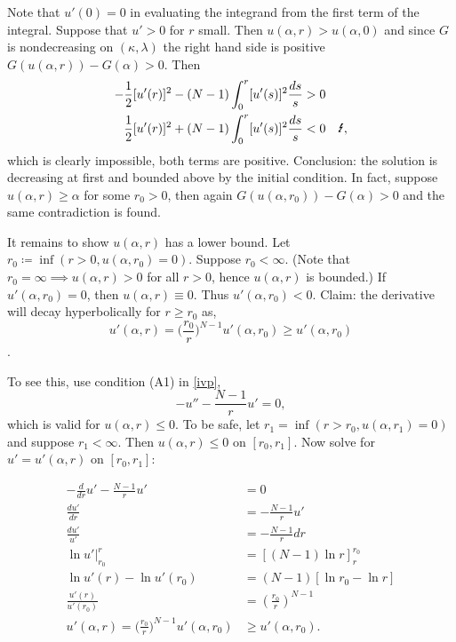 Note that $u'(0)=0$ in evaluating the integrand from the first term of the integral. Suppose that $u'>0$ for $r$ small. Then $u(\alpha,r)>u(\alpha,0)$ and since $G$ is nondecreasing on $(\kappa,\lambda)$ the right hand side is positive $G(u(\alpha,r))-G(\alpha)>0$. Then
\begin{align*}
-\frac{1}{2}[u'(r)]^2-(N-1)\int_0^r[u'(s)]^2\frac{ds}{s}&>0\\
\frac{1}{2}[u'(r)]^2+(N-1)\int_0^r[u'(s)]^2\frac{ds}{s}&<0\quad\text{\Lightning},
\end{align*}
which is clearly impossible, both terms are positive. Conclusion: the solution is decreasing at first and bounded above by the initial condition. In fact, suppose $u(\alpha,r)\geq\alpha$ for some $r_0>0$, then again $G(u(\alpha,r_0))-G(\alpha)>0$ and the same contradiction is found.

It remains to show $u(\alpha,r)$ has a lower bound. Let $r_0\coloneqq\inf(r>0,u(\alpha,r_0)=0).$ Suppose $r_0<\infty$. (Note that $r_0=\infty\implies u(\alpha,r)>0$ for all $r>0$, hence $u(\alpha,r)$ is bounded.) If $u'(\alpha,r_0)=0$, then $u(\alpha,r)\equiv0$. Thus $u'(\alpha,r_0)<0$. Claim: the derivative will decay hyperbolically for $r\geq r_0$ as,  $$u'(\alpha,r)=\big(\frac{r_0}{r}\big)^{N-1}u'(\alpha,r_0)\geq u'(\alpha,r_0)$$.

To see this, use condition (A1) in \eqref{ivp},
$$-u''-\frac{N-1}{r}u'=0,$$%
which is valid for $u(\alpha,r)\leq0.$ To be safe, let $r_1=\inf(r>r_0,u(\alpha,r_1)=0)$ and suppose $r_1<\infty$. Then $u(\alpha,r)\leq0$ on $[r_0,r_1]$. Now solve for $u'=u'(\alpha,r)$ on $[r_0,r_1]$:

\begin{align*}
-\frac{d}{dr}u'-\frac{N-1}{r}u'&=0\\
\frac{du'}{dr}&=-\frac{N-1}{r}u'\\
\frac{du'}{u'}&=-\frac{N-1}{r}dr\\
\left.\ln{u'}\right\rvert_{r_0}^r&=\left[(N-1)\ln{r}\right]_r^{r_0}\\
\ln{u'(r)}-\ln{u'(r_0)}&=(N-1)\left[\ln{r_0}-\ln{r}\right]\\
\frac{u'(r)}{u'(r_0)}&=\left(\frac{r_0}{r}\right)^{N-1}\\
u'(\alpha,r)=\big(\frac{r_0}{r}\big)^{N-1}u'(\alpha,r_0)&\geq u'(\alpha,r_0).%
\end{align*}

